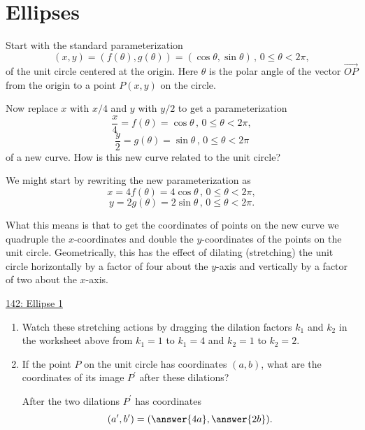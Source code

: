 \documentclass{ximera}
\begin{document}
\section{Ellipses}
\begin{example} \label{Ex:DFDrefdfobbzx}
Start with the standard parameterization 
\[
    (x,y) = (f(\theta) , g(\theta)) =   ( \cos \theta , \sin \theta ) \, , \, 0\leq\theta < 2\pi ,
\]
of the unit circle centered at the origin. Here $\theta$ is the polar angle of the vector $\overrightarrow{OP}$ from the origin to a point $P(x,y)$ on the circle.

Now replace $x$ with $x/4$ and $y$ with $y/2$ to get a parameterization
\[
  \frac{x}{4} = f(\theta) = \cos\theta \, , \, 0\leq\theta < 2\pi ,
\]
\[
  \frac{y}{2} = g(\theta) = \sin \theta \, , \, 0\leq\theta < 2\pi 
\]
of a new curve. How is this new curve related to the unit circle?

We might start by rewriting the new parameterization as
\[
      x = 4 f(\theta) = 4\cos\theta \, , \, 0\leq\theta < 2\pi ,
\]
\[ 
   y = 2 g(\theta) = 2\sin \theta \, , \, 0\leq\theta < 2\pi .
\]

What this means is that to get the coordinates of points on the new curve we quadruple the $x$-coordinates and double the $y$-coordinates of the points on the unit circle. Geometrically, this has the effect of dilating (stretching) the unit circle horizontally by a factor of four about the $y$-axis and vertically by a factor of two about the $x$-axis. 


\begin{onlineOnly}
    \begin{center}
\end{center}
\end{onlineOnly}

\href{https://www.desmos.com/calculator/3ibj708prx}{142: Ellipse 1}

\begin{enumerate}
\item Watch these stretching actions by dragging the dilation factors $k_1$ and $k_2$ in the worksheet above from $k_1=1$ to $k_1=4$ and $k_2=1$ to $k_2 = 2$.

\item If the point $P$ on the unit circle has coordinates $(a,b)$, what are the coordinates of its image $P^\prime$ after these dilations?

After the two dilations $P^\prime$ has coordinates
\[
    (a^\prime, b^\prime) = (  \answer{4a} , \answer{2b} ) .
\]


\end{enumerate}
\end{example}
\end{document}
